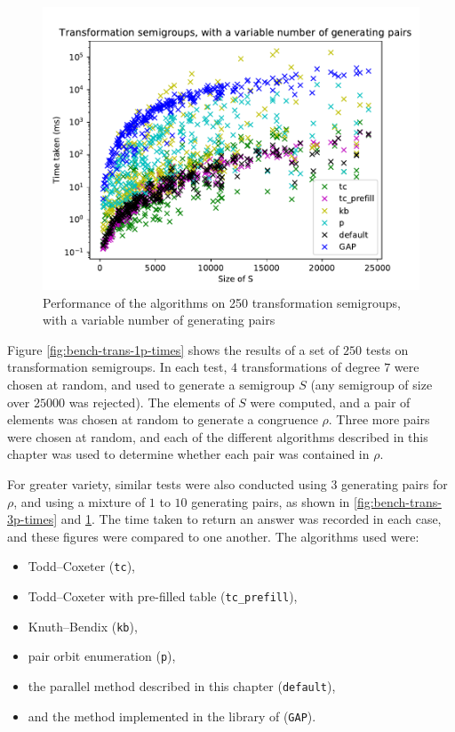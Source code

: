 \begin{figure}[p]
  \centering
  \includegraphics[width=\textwidth]{pics/ch-pairs/bench-trans-vp-times}
  \caption[Benchmark: all algorithms, concrete, $n$ pairs]
  {Performance of the algorithms on 250 transformation semigroups, with
    a variable number of generating pairs}
  \label{fig:bench-trans-vp-times}
\end{figure}

Figure \ref{fig:bench-trans-1p-times} shows the results of a set of $250$ tests
on transformation semigroups.  In each test, $4$ transformations of degree $7$
were chosen at random, and used to generate a semigroup $S$ (any semigroup of
size over $25000$ was rejected).  The elements of $S$ were computed, and a pair
of elements was chosen at random to generate a congruence $\rho$.  Three more
pairs were chosen at random, and each of the different algorithms described in
this chapter was used to determine whether each pair was contained in $\rho$.

For greater variety, similar tests were also conducted using $3$ generating
pairs for $\rho$, and using a mixture of $1$ to $10$ generating pairs,
as shown in \ref{fig:bench-trans-3p-times} and \ref{fig:bench-trans-vp-times}.
The time taken to return an answer was recorded in each case, and these figures
were compared to one another.  The algorithms used were:
\begin{itemize}
\item Todd--Coxeter (\texttt{tc}),
\item Todd--Coxeter with pre-filled table (\texttt{tc\_prefill}),
\item Knuth--Bendix (\texttt{kb}),
\item pair orbit enumeration (\texttt{p}),
\item the parallel method described in this chapter (\texttt{default}),
\item and the method implemented in the library of \GAP{} (\texttt{GAP}).
\end{itemize}

